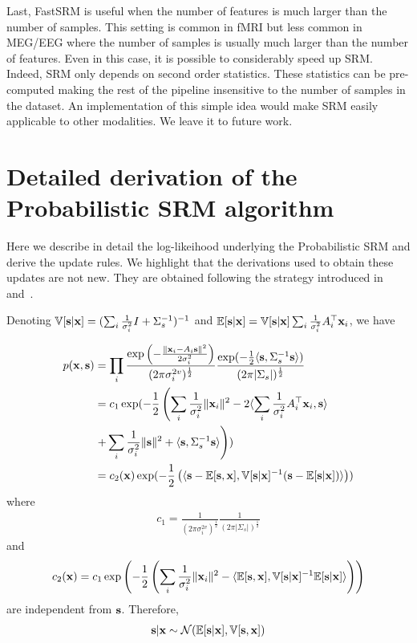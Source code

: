 \documentclass{article}
\newcommand{\bt}[1]{\todo[color=orange, inline=True]{BT: #1}}
\begin{document}
Last, FastSRM is useful when the number of features is much larger than the
number of samples. This setting is common in fMRI but less common in MEG/EEG where
the number of samples is usually much larger than the number of features. Even
in this case, it is possible to considerably speed up SRM. Indeed, SRM only
depends on second order statistics.
These statistics can be pre-computed making the rest of the
pipeline insensitive to the number of samples in the dataset. An implementation
of this simple idea would make SRM easily applicable to other modalities.
We leave it to future work.





\newpage
\appendix

\section{Detailed derivation of the Probabilistic SRM algorithm}
\label{details:probsrm}
Here we describe in detail the log-likeihood underlying the
Probabilistic SRM and derive the update rules.
We highlight that the derivations used to obtain these updates are not new. They are obtained following the strategy introduced in~\cite{anderson2016enabling} and~\cite{chen2015reduced}.

%
Denoting $\mathbb{V}[\mathbf{s} | \mathbf{x}] = (\sum_i \frac1{\sigma_i^2} I +
\Sigma_s^{-1})^{-1}$ and $\mathbb{E}[\mathbf{s} | \mathbf{x}] = \mathbb{V}[\mathbf{s} | \mathbf{x}] \sum_i \frac1{\sigma_i^2}
A_i^{\top}\mathbf{x}_i$, we have

\begin{align}
  p(\mathbf{x}, \mathbf{s}) &= \prod_i \frac{\exp \left(-\frac{\|\mathbf{x}_i - A_i \mathbf{s} \|^2}{2 \sigma_i^2} \right) }{(2 \pi \sigma_i^{2v})^{\frac12}} \frac{\exp(-\frac12 \langle{ \mathbf{s}},{ \Sigma_s^{-1} \mathbf{s} }\rangle )}{(2 \pi | \Sigma_s|)^{\frac12}} \\
               &= c_1 \exp (-\frac12 \left( \sum_i \frac1{\sigma_i^2}\|\mathbf{x}_i\|^2 - 2  \langle{ \sum_i \frac1{\sigma_i^2} A_i^{\top}\mathbf{x}_i},{ \mathbf{s} }\rangle \right. \\& \left.+ \sum_i \frac1{\sigma_i^2} \| \mathbf{s} \|^2 + \langle{ \mathbf{s}},{ \Sigma_s^{-1} \mathbf{s} }\rangle  \right)) \\
               &= c_2(\mathbf{x}) \exp(-\frac12 \left( \langle{  \mathbf{s}- \mathbb{E}[\mathbf{s}},{ \mathbf{x}], \mathbb{V}[\mathbf{s} | \mathbf{x}]^{-1} ( \mathbf{s} - \mathbb{E}[\mathbf{s} | \mathbf{x}])  }\rangle \right)) \label{probsrmcompleted}
\end{align}
where
\begin{align}
  c_1 = \frac1{(2 \pi \sigma_i^{2v})^{\frac12}}\frac1{(2 \pi |
  \Sigma_s|)^{\frac12}}
\end{align}
and
\begin{align}
  c_2(\mathbf{x}) = c_1 \exp \left( -\frac12 \left( \sum_i \frac1{\sigma_i^2}\|\mathbf{x}_i\|^2 - \langle{  \mathbb{E}[\mathbf{s}},{ \mathbf{x}], \mathbb{V}[\mathbf{s} | \mathbf{x}]^{-1} \mathbb{E}[\mathbf{s} | \mathbf{x}] }\rangle \right) \right)
\end{align}
are independent from $\mathbf{s}$.
%
Therefore,
\begin{align}
  \mathbf{s}| \mathbf{x} \sim \mathcal{N}(\mathbb{E}[\mathbf{s} | \mathbf{x}], \mathbb{V}[\mathbf{s}, \mathbf{x}])
\end{align}
\end{document}
